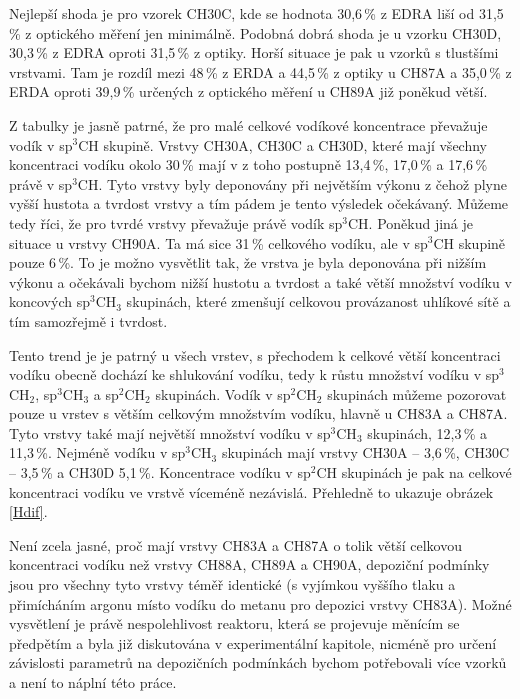 Nejlepší shoda je pro vzorek CH30C, kde se hodnota 30,6\,\% z EDRA liší od 31,5\,\% z optického měření jen minimálně. Podobná dobrá shoda je u vzorku CH30D, 30,3\,\% z EDRA oproti 31,5\,\% z optiky. Horší situace je pak u vzorků s tlustšími vrstvami. Tam je rozdíl mezi 48\,\% z ERDA a 44,5\,\% z optiky u CH87A a 35,0\,\% z ERDA oproti 39,9\,\% určených z optického měření u CH89A již poněkud větší.

Z tabulky je jasně patrné, že pro malé celkové vodíkové koncentrace převažuje vodík v sp$^3$CH skupině. Vrstvy CH30A, CH30C a CH30D, které mají všechny koncentraci vodíku okolo 30\,\% mají v z toho postupně 13,4\,\%, 17,0\,\% a 17,6\,\% právě v sp$^3$CH. Tyto vrstvy byly deponovány při největším výkonu z čehož plyne vyšší hustota a tvrdost vrstvy a tím pádem je tento výsledek očekávaný. 
Můžeme tedy říci, že pro tvrdé vrstvy převažuje právě vodík sp$^3$CH. Poněkud jiná je situace u vrstvy CH90A. Ta má sice 31\,\% celkového vodíku, ale v sp$^3$CH skupině pouze 6\,\%. To je možno vysvětlit tak, že vrstva je byla deponována při nižším výkonu a očekávali bychom nižší hustotu a tvrdost a také větší množství vodíku v koncových sp$^3$CH$_3$ skupinách, které zmenšují celkovou provázanost uhlíkové sítě a tím samozřejmě i tvrdost. 

Tento trend je je patrný u všech vrstev, s přechodem k celkové větší koncentraci vodíku obecně dochází ke shlukování vodíku, tedy k růstu množství vodíku v sp$^3$CH$_2$, sp$^3$CH$_3$ a sp$^2$CH$_2$ skupinách. Vodík v sp$^2$CH$_2$ skupinách můžeme pozorovat pouze u vrstev s větším celkovým množstvím vodíku, hlavně u CH83A a CH87A. Tyto vrstvy také mají největší množství vodíku v sp$^3$CH$_3$ skupinách, 12,3\,\% a 11,3\,\%. Nejméně vodíku v sp$^3$CH$_3$ skupinách mají vrstvy CH30A -- 3,6\,\%, CH30C -- 3,5\,\% a CH30D 5,1\,\%. Koncentrace vodíku v sp$^2$CH skupinách je pak na celkové koncentraci vodíku ve vrstvě víceméně nezávislá. Přehledně to ukazuje obrázek \ref{Hdif}.

Není zcela jasné, proč mají vrstvy CH83A a CH87A o tolik větší celkovou koncentraci vodíku než vrstvy CH88A, CH89A a CH90A, depoziční podmínky jsou pro všechny tyto vrstvy téměř identické (s vyjímkou vyššího tlaku a přimícháním argonu místo vodíku do metanu pro depozici vrstvy CH83A). 
Možné vysvětlení je právě nespolehlivost reaktoru, která se projevuje měnícím se předpětím a byla již diskutována v experimentální kapitole, nicméně pro určení závislosti parametrů na depozičních podmínkách bychom potřebovali více vzorků a není to náplní této práce.

